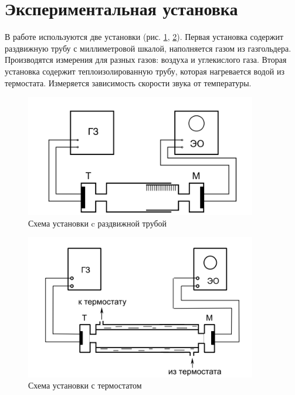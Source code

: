 \documentclass[a4paper,12pt]{article} %
\begin{document}
\section{Экспериментальная установка}
В работе используются две установки (рис. \ref{схема1}, \ref{схема2}). Первая установка содержит раздвижную трубу с миллиметровой шкалой, наполняется газом из газгольдера. Производятся измерения для разных газов: воздуха и углекислого газа. Вторая установка содержит теплоизолированную трубу, которая нагревается водой из термостата. Измеряется зависимость скорости звука от температуры.

\begin{figure}[h!]
\begin{center}
\includegraphics[width=0.9\textwidth]{Схема1.png}
\end{center}
\caption{Схема установки c раздвижной трубой} 
\label{схема1}
\end{figure}

\begin{figure}[h!]
\begin{center}
\includegraphics[width=0.9\textwidth]{Схема2}
\end{center}
\caption{Схема установки с термостатом} \label{схема2}
\end{figure} 
\end{document}
